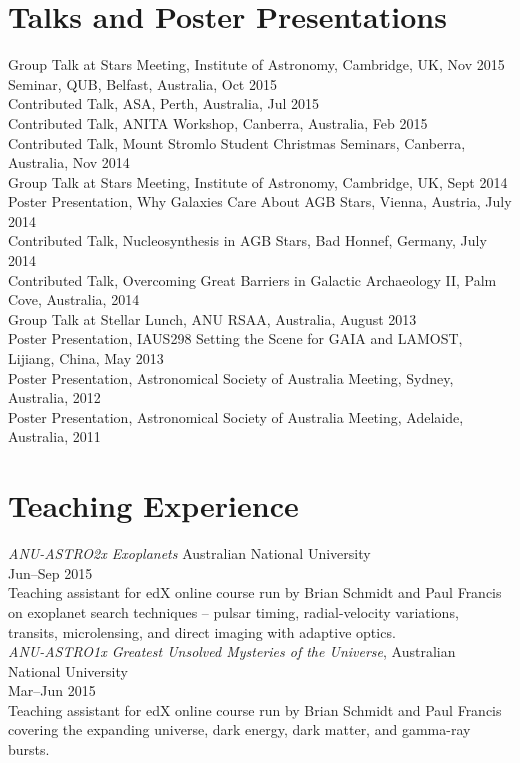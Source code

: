 \documentclass[11pt]{res} %
\begin{document}
\begin{resume}
\section{Talks and Poster Presentations}
	Group Talk at Stars Meeting, Institute of Astronomy, Cambridge, UK, Nov 2015\\
	Seminar, QUB, Belfast, Australia, Oct 2015\\
	Contributed Talk, ASA, Perth, Australia, Jul 2015\\
	Contributed Talk, ANITA Workshop, Canberra, Australia, Feb 2015\\
	Contributed Talk, Mount Stromlo Student Christmas Seminars, Canberra, Australia, Nov 2014\\
	Group Talk at Stars Meeting, Institute of Astronomy, Cambridge, UK, Sept 2014\\
	Poster Presentation, Why Galaxies Care About AGB Stars, Vienna, Austria, July 2014\\
	Contributed Talk, Nucleosynthesis in AGB Stars, Bad Honnef, Germany, July 2014\\
	Contributed Talk, Overcoming Great Barriers in Galactic Archaeology II, Palm Cove, Australia, 2014\\
	Group Talk at Stellar Lunch, ANU RSAA, Australia, August 2013\\
	Poster Presentation, IAUS298 Setting the Scene for GAIA and LAMOST, Lijiang, China, May 2013\\
	Poster Presentation, Astronomical Society of Australia Meeting, Sydney, Australia, 2012\\
	Poster Presentation, Astronomical Society of Australia Meeting, Adelaide, Australia, 2011	

\section{Teaching Experience}
	{\it ANU-ASTRO2x Exoplanets} \hfill Australian National University\\
	\null\hfill Jun--Sep 2015\\
	Teaching assistant for edX online course run by Brian Schmidt and Paul Francis on exoplanet search techniques -- pulsar timing, radial-velocity variations, transits, microlensing, and direct imaging with adaptive optics.\\

	{\it ANU-ASTRO1x Greatest Unsolved Mysteries of the Universe}, \hfill Australian National University\\
	\null\hfill Mar--Jun 2015\\
	Teaching assistant for edX online course run by Brian Schmidt and Paul Francis covering the expanding universe, dark energy, dark matter, and gamma-ray bursts.\\


\end{resume}
\end{document}
